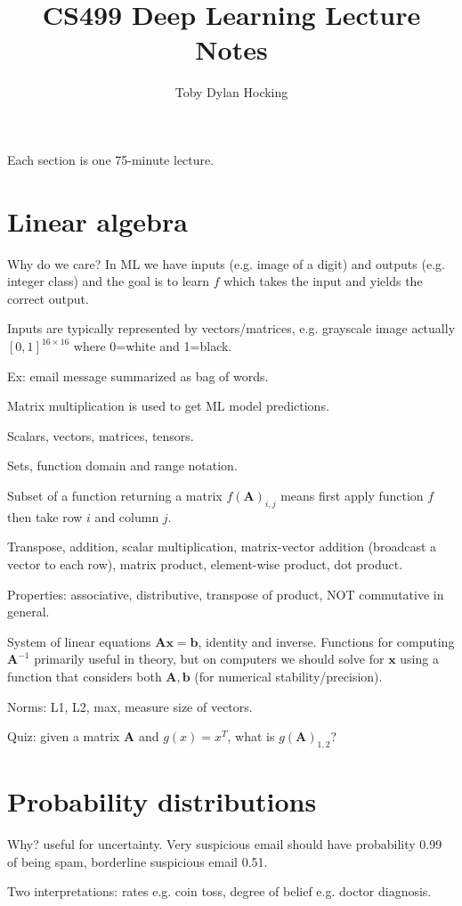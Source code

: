 \documentclass{article}
\begin{document}
\title{CS499 Deep Learning Lecture Notes}
\author{Toby Dylan Hocking}

Each section is one 75-minute lecture.

\section{Linear algebra}

Why do we care? In ML we have inputs (e.g. image of a digit) and
outputs (e.g. integer class) and the goal is to learn $f$ which takes
the input and yields the correct output.

Inputs are typically represented by vectors/matrices, e.g. grayscale
image actually $[0,1]^{16 \times 16}$ where 0=white and 1=black.

Ex: email message summarized as bag of words.

Matrix multiplication is used to get ML model predictions.

Scalars, vectors, matrices, tensors.

Sets, function domain and range notation.

Subset of a function returning a matrix $f(\mathbf A)_{i,j}$ means
first apply function $f$ then take row $i$ and column $j$.

Transpose, addition, scalar multiplication, matrix-vector addition
(broadcast a vector to each row), matrix product, element-wise
product, dot product.

Properties: associative, distributive, transpose of product, NOT
commutative in general.

System of linear equations $\mathbf A \mathbf x = \mathbf b$, identity
and inverse. Functions for computing $\mathbf A^{-1}$ primarily useful
in theory, but on computers we should solve for $\mathbf x$ using a
function that considers both $\mathbf A,\mathbf b$ (for numerical
stability/precision).

Norms: L1, L2, max, measure size of vectors.

Quiz: given a matrix $\mathbf A$ and $g(x)=x^T$, what is $g(\mathbf A)_{1,2}$?

\section{Probability distributions}

Why? useful for uncertainty. Very suspicious email should have
probability 0.99 of being spam, borderline suspicious email 0.51.

Two interpretations: rates e.g. coin toss, degree of belief
e.g. doctor diagnosis.
\end{document}
